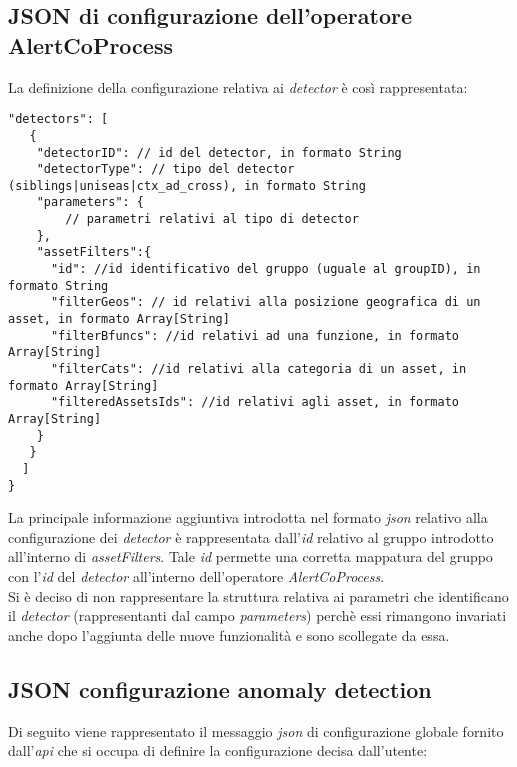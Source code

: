 \subsection{JSON di configurazione dell'operatore AlertCoProcess}\label{sec:json-detectors}
La definizione della configurazione relativa ai \textit{detector} è così rappresentata:
\begin{verbatim}
"detectors": [
   {
    "detectorID": // id del detector, in formato String
    "detectorType": // tipo del detector (siblings|uniseas|ctx_ad_cross), in formato String
    "parameters": {
		// parametri relativi al tipo di detector    
    },
    "assetFilters":{
      "id": //id identificativo del gruppo (uguale al groupID), in formato String
      "filterGeos": // id relativi alla posizione geografica di un asset, in formato Array[String]
      "filterBfuncs": //id relativi ad una funzione, in formato Array[String]
      "filterCats": //id relativi alla categoria di un asset, in formato Array[String]
      "filteredAssetsIds": //id relativi agli asset, in formato Array[String]
    }
   }
  ]
}
\end{verbatim}
La principale informazione aggiuntiva introdotta nel formato \textit{\gls{json}} relativo alla configurazione dei \textit{detector} è rappresentata dall'\textit{id} relativo al gruppo introdotto all'interno di \textit{assetFilters}. Tale \textit{id} permette una corretta mappatura del gruppo con l'\textit{id} del \textit{detector} all'interno dell'operatore \textit{AlertCoProcess}.\\
Si è deciso di non rappresentare la struttura relativa ai parametri che identificano il \textit{detector} (rappresentanti dal campo \textit{parameters}) perchè essi rimangono invariati anche dopo l'aggiunta delle nuove funzionalità e sono scollegate da essa.

\subsection{JSON configurazione anomaly detection}
Di seguito viene rappresentato il messaggio \textit{\gls{json}} di configurazione globale fornito dall'\textit{\gls{api}} che si occupa di definire la configurazione decisa dall'utente:

